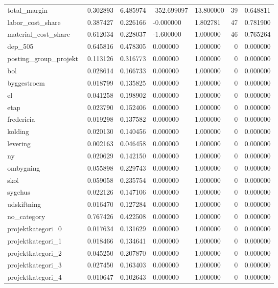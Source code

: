 \begin{landscape}
\begin{longtable}[h!]{lrrllrr}
total_margin & -0.302893 & 6.485974 & -352.699097 & 13.800000 & 39 & 0.648811 \\
labor_cost_share & 0.387427 & 0.226166 & -0.000000 & 1.802781 & 47 & 0.781900 \\
material_cost_share & 0.612034 & 0.228037 & -1.600000 & 1.000000 & 46 & 0.765264 \\
dep_505 & 0.645816 & 0.478305 & 0.000000 & 1.000000 & 0 & 0.000000 \\
posting_group_projekt & 0.113126 & 0.316773 & 0.000000 & 1.000000 & 0 & 0.000000 \\
bol & 0.028614 & 0.166733 & 0.000000 & 1.000000 & 0 & 0.000000 \\
byggestroem & 0.018799 & 0.135825 & 0.000000 & 1.000000 & 0 & 0.000000 \\
el & 0.041258 & 0.198902 & 0.000000 & 1.000000 & 0 & 0.000000 \\
etap & 0.023790 & 0.152406 & 0.000000 & 1.000000 & 0 & 0.000000 \\
fredericia & 0.019298 & 0.137582 & 0.000000 & 1.000000 & 0 & 0.000000 \\
kolding & 0.020130 & 0.140456 & 0.000000 & 1.000000 & 0 & 0.000000 \\
levering & 0.002163 & 0.046458 & 0.000000 & 1.000000 & 0 & 0.000000 \\
ny & 0.020629 & 0.142150 & 0.000000 & 1.000000 & 0 & 0.000000 \\
ombygning & 0.055898 & 0.229743 & 0.000000 & 1.000000 & 0 & 0.000000 \\
skol & 0.059058 & 0.235754 & 0.000000 & 1.000000 & 0 & 0.000000 \\
sygehus & 0.022126 & 0.147106 & 0.000000 & 1.000000 & 0 & 0.000000 \\
udskiftning & 0.016470 & 0.127284 & 0.000000 & 1.000000 & 0 & 0.000000 \\
no_category & 0.767426 & 0.422508 & 0.000000 & 1.000000 & 0 & 0.000000 \\
projektkategori_0 & 0.017634 & 0.131629 & 0.000000 & 1.000000 & 0 & 0.000000 \\
projektkategori_1 & 0.018466 & 0.134641 & 0.000000 & 1.000000 & 0 & 0.000000 \\
projektkategori_2 & 0.045250 & 0.207870 & 0.000000 & 1.000000 & 0 & 0.000000 \\
projektkategori_3 & 0.027450 & 0.163403 & 0.000000 & 1.000000 & 0 & 0.000000 \\
projektkategori_4 & 0.010647 & 0.102643 & 0.000000 & 1.000000 & 0 & 0.000000 \\

\end{longtable}
\end{landscape}
